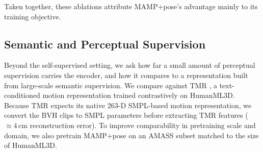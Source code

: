 \documentclass[letterpaper]{article} %
\begin{document}
Taken together, these ablations attribute MAMP+pose's advantage  mainly to its training objective. 



\subsection{Semantic and Perceptual Supervision}
\label{sec:tmr}
\label{sec:finetune}
Beyond the self-supervised setting, we ask how far a small amount of perceptual supervision carries the encoder, and how it compares to a representation built from large-scale semantic supervision. We compare against TMR \citep{petrovich2023tmr}, a text-conditioned motion representation trained
contrastively on HumanML3D.  Because TMR expects its native 263-D SMPL-based motion representation, we convert the BVH clips to SMPL parameters before extracting TMR features ($\approx 4$\,cm reconstruction error). To improve comparability in pretraining scale and domain, we also pretrain MAMP+pose on an AMASS subset matched to the size of HumanML3D.


\end{document}
